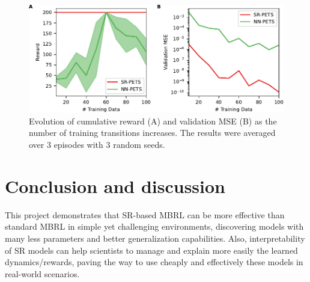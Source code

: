\documentclass[11pt]{article}
\begin{document}
\begin{figure}
	\centering
	\includegraphics{cartpole.pdf}
	\caption{Evolution of cumulative reward (A) and validation MSE (B) as the number of training transitions increases. The results were averaged over 3 episodes with 3 random seeds.}
	\label{fig: cartpole}
\end{figure}


\section{Conclusion and discussion}
This project demonstrates that SR-based MBRL can be more effective than standard MBRL in simple yet challenging environments, discovering models with many less parameters and better generalization capabilities. Also, interpretability of SR models can help scientists to manage and explain more easily the learned dynamics/rewards, paving the way to use cheaply and effectively these models in real-world scenarios.
\end{document}
